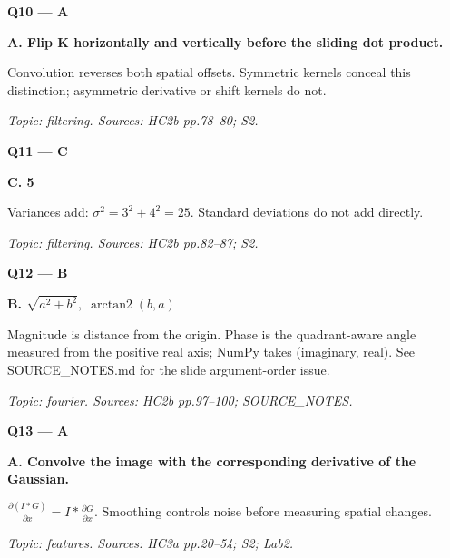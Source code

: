 \documentclass[11pt,a4paper]{article}
\begin{document}
\par\vspace{12pt}
\begin{minipage}{\linewidth}
\textbf{Q10 — A}\par\smallskip
\textbf{A. Flip K horizontally and vertically before the sliding dot product.}\par
Convolution reverses both spatial offsets. Symmetric kernels conceal this distinction; asymmetric derivative or shift kernels do not.\par
{\small\itshape Topic: filtering. Sources: HC2b pp.78–80; S2.}

\end{minipage}
\par\vspace{12pt}
\begin{minipage}{\linewidth}
\textbf{Q11 — C}\par\smallskip
\textbf{C. 5}\par
Variances add: \(\sigma^2=3^2+4^2=25\). Standard deviations do not add directly.\par
{\small\itshape Topic: filtering. Sources: HC2b pp.82–87; S2.}

\end{minipage}
\par\vspace{12pt}
\begin{minipage}{\linewidth}
\textbf{Q12 — B}\par\smallskip
\textbf{B. \(\sqrt{a^2+b^2},\;\operatorname{arctan2}(b,a)\)}\par
Magnitude is distance from the origin. Phase is the quadrant-aware angle measured from the positive real axis; NumPy takes (imaginary,\allowbreak{} real). See SOURCE\_\allowbreak{}NOTES.md for the slide argument-order issue.\par
{\small\itshape Topic: fourier. Sources: HC2b pp.97–100; SOURCE\_\allowbreak{}NOTES.}

\end{minipage}
\par\vspace{12pt}
\begin{minipage}{\linewidth}
\textbf{Q13 — A}\par\smallskip
\textbf{A. Convolve the image with the corresponding derivative of the Gaussian.}\par
\(\frac{\partial(I*G)}{\partial x}=I*\frac{\partial G}{\partial x}\). Smoothing controls noise before measuring spatial changes.\par
{\small\itshape Topic: features. Sources: HC3a pp.20–54; S2; Lab2.}

\end{minipage}
\end{document}
